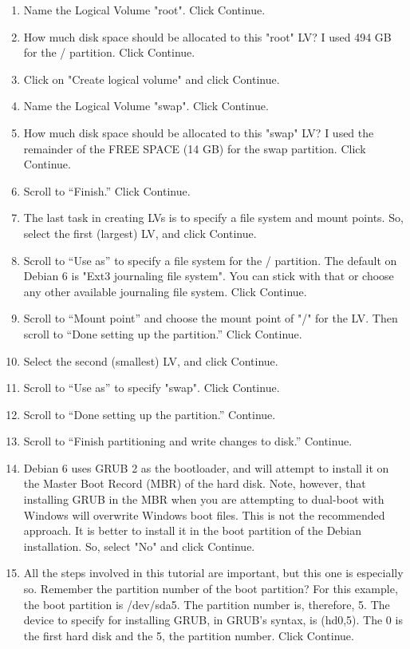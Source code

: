 \documentclass[12pt,notitlepage,onecolumn,oneside,draft]{memoir}
\begin{document}
\begin{enumerate}
\item Name the Logical Volume "root". Click Continue. 
\item How much disk space should be allocated to this "root" LV? I used 494 GB for the / partition. Click Continue. 
\item Click on "Create logical volume" and click Continue. 
\item Name the Logical Volume "swap". Click Continue. 
\item How much disk space should be allocated to this "swap" LV? I used the remainder of the FREE SPACE (14 GB) for the swap partition. Click Continue. 
\item Scroll to “Finish.” Click Continue. 
\item The last task in creating LVs is to specify a file system and mount points. So, select the first (largest) LV, and click Continue. 
\item Scroll to “Use as” to specify a file system for the / partition. The default on Debian 6 is "Ext3 journaling file system". You can stick with that or choose any other available journaling file system. Click Continue. 
\item Scroll to “Mount point” and choose the mount point of "/" for the LV. Then scroll to “Done setting up the partition.” Click Continue. 
\item Select the second (smallest) LV, and click Continue. 
\item Scroll to “Use as” to specify "swap". Click Continue. 
\item Scroll to “Done setting up the partition.” Continue. 
\item Scroll to “Finish partitioning and write changes to disk.” Continue. 
\item Debian 6 uses GRUB 2 as the bootloader, and will attempt to install it on the Master Boot Record (MBR) of the hard disk. Note, however, that installing GRUB in the MBR when you are attempting to dual-boot with Windows will overwrite Windows boot files. This is not the recommended approach. It is better to install it in the boot partition of the Debian installation. So, select "No" and click Continue. 
\item All the steps involved in this tutorial are important, but this one is especially so. Remember the partition number of the boot partition? For this example, the boot partition is /dev/sda5. The partition number is, therefore, 5. The device to specify for installing GRUB, in GRUB’s syntax, is (hd0,5). The 0 is the first hard disk and the 5, the partition number. Click Continue. 

\end{enumerate}
\end{document}
